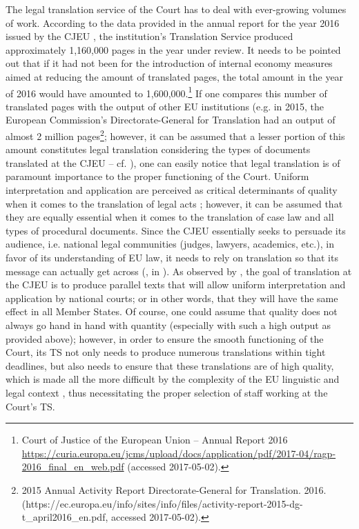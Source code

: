 \documentclass[output=paper]{langsci/langscibook}
\begin{document}
The legal translation service of the Court has to deal with ever-growing volumes of work. According to the data provided in the annual report for the year 2016 issued by the CJEU \citep{ar2017}, the institution’s Translation Service produced approximately 1,160,000 pages in the year under review. It needs to be pointed out that if it had not been for the introduction of internal economy measures aimed at reducing the amount of translated pages, the total amount in the year of 2016 would have amounted to 1,600,000.\footnote{Court of Justice of the European Union – Annual Report 2016 \url{https://curia.europa.eu/jcms/upload/docs/application/pdf/2017-04/ragp-2016_final_en_web.pdf} (accessed 2017-05-02).} If one compares this number of translated pages with the output of other EU institutions (e.g. in 2015, the European Commission’s Directorate-General for Translation had an output of almost 2 million pages\footnote{2015 Annual Activity Report Directorate-General for Translation. 2016. (https://ec.europa.eu/info/sites/info/files/activity-report-2015-dg-t\_april2016\_en.pdf, accessed 2017-05-02).}; however, it can be assumed that a lesser portion of this amount constitutes legal translation considering the types of documents translated at the CJEU – cf. \citealt{McAuliffe2012}), one can easily notice that legal translation is of paramount importance to the proper functioning of the Court. Uniform interpretation and application are perceived as critical determinants of quality when it comes to the translation of legal acts \citep[73]{Šarčević1997}; however, it can be assumed that they are equally essential when it comes to the translation of case law and all types of procedural documents. Since the CJEU essentially seeks to persuade its audience, i.e. national legal communities (judges, lawyers, academics, etc.), in favor of its understanding of EU law, it needs to rely on translation so that its message can actually get across (\citealt[85]{Łachacz2013}, in \citealt[296]{Paunio2007}). As observed by \citet[9]{McAuliffe2014}, the goal of translation at the CJEU is to produce parallel texts that will allow uniform interpretation and application by national courts; or in other words, that they will have the same effect in all Member States. Of course, one could assume that quality does not always go hand in hand with quantity (especially with such a high output as provided above); however, in order to ensure the smooth functioning of the Court, its TS not only needs to produce numerous translations within tight deadlines, but also needs to ensure that these translations are of high quality, which is made all the more difficult by the complexity of the EU linguistic and legal context \citep[69]{Kjær2007}, thus necessitating the proper selection of staff working at the Court’s TS.
\end{document}
